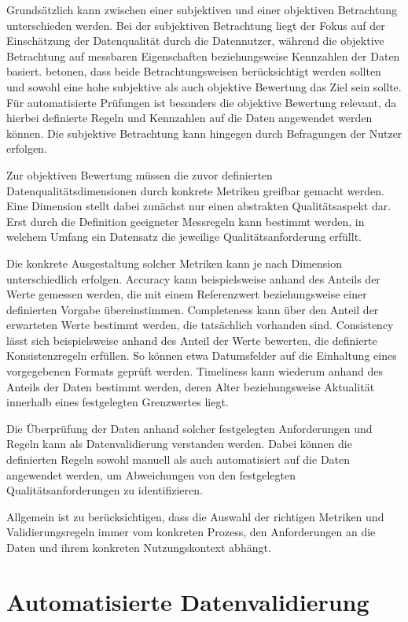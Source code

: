 \documentclass[../main.tex]{subfiles}
\begin{document}
Grundsätzlich kann zwischen einer subjektiven und einer objektiven Betrachtung unterschieden werden. Bei der subjektiven Betrachtung liegt der Fokus auf der Einschätzung der Datenqualität durch die Datennutzer, während die objektive Betrachtung auf messbaren Eigenschaften beziehungsweise Kennzahlen der Daten basiert. \textcite{pipinoDataQualityAssessment} betonen, dass beide Betrachtungsweisen berücksichtigt werden sollten und sowohl eine hohe subjektive als auch objektive Bewertung das Ziel sein sollte. Für automatisierte Prüfungen ist besonders die objektive Bewertung relevant, da hierbei definierte Regeln und Kennzahlen auf die Daten angewendet werden können. Die subjektive Betrachtung kann hingegen durch Befragungen der Nutzer erfolgen.

Zur objektiven Bewertung müssen die zuvor definierten Datenqualitätsdimensionen durch konkrete Metriken greifbar gemacht werden. Eine Dimension stellt dabei zunächst nur einen abstrakten Qualitätsaspekt dar. Erst durch die Definition geeigneter Messregeln kann bestimmt werden, in welchem Umfang ein Datensatz die jeweilige Qualitätsanforderung erfüllt.

Die konkrete Ausgestaltung solcher Metriken kann je nach Dimension unterschiedlich erfolgen. Accuracy kann beispielsweise anhand des Anteils der Werte gemessen werden, die mit einem Referenzwert beziehungsweise einer definierten Vorgabe übereinstimmen. Completeness kann über den Anteil der erwarteten Werte bestimmt werden, die tatsächlich vorhanden sind. Consistency lässt sich beispielsweise anhand des Anteil der Werte bewerten, die definierte Konsistenzregeln erfüllen. So können etwa Datumsfelder auf die Einhaltung eines vorgegebenen Formats geprüft werden. Timeliness kann wiederum anhand des Anteils der Daten bestimmt werden, deren Alter beziehungsweise Aktualität innerhalb eines festgelegten Grenzwertes liegt.

Die Überprüfung der Daten anhand solcher festgelegten Anforderungen und Regeln kann als Datenvalidierung verstanden werden. Dabei können die definierten Regeln sowohl manuell als auch automatisiert auf die Daten angewendet werden, um Abweichungen von den festgelegten Qualitätsanforderungen zu identifizieren.

Allgemein ist zu berücksichtigen, dass die Auswahl der richtigen Metriken und Validierungsregeln immer vom konkreten Prozess, den Anforderungen an die Daten und ihrem konkreten Nutzungskontext abhängt.

\section{Automatisierte Datenvalidierung}
\end{document}
